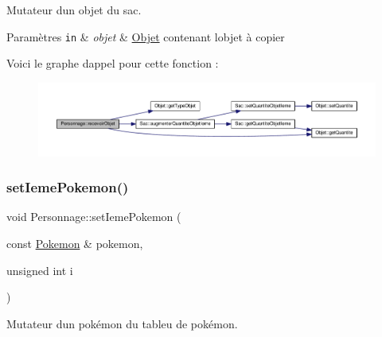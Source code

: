 Mutateur d\textquotesingle{}un objet du sac. 


\begin{DoxyParams}[1]{Paramètres}
\mbox{\tt in}  & {\em objet} & \hyperlink{class_objet}{Objet} contenant l\textquotesingle{}objet à copier \\
\hline
\end{DoxyParams}
Voici le graphe d\textquotesingle{}appel pour cette fonction \+:\nopagebreak
\begin{figure}[H]
\begin{center}
\leavevmode
\includegraphics[width=350pt]{class_personnage_a70fb0f0180dd625cf96dfc469ae5710e_cgraph}
\end{center}
\end{figure}
\mbox{\label{class_personnage_ae9e94e72e002695ae1461aa538e5e880}} 
\subsubsection{\texorpdfstring{set\+Ieme\+Pokemon()}{setIemePokemon()}}
{\footnotesize\ttfamily void Personnage\+::set\+Ieme\+Pokemon (\begin{DoxyParamCaption}\item[{const \hyperlink{class_pokemon}{Pokemon} \&}]{pokemon,  }\item[{unsigned int}]{i }\end{DoxyParamCaption})}



Mutateur d\textquotesingle{}un pokémon du tableu de pokémon. 


